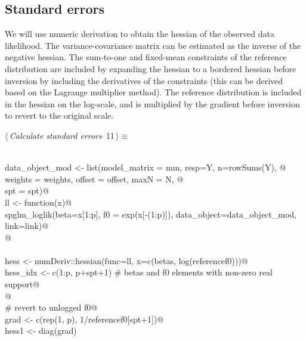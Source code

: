 \documentclass[reqno]{amsart}
\renewcommand{\NWtarget}[2]{\hypertarget{#1}{#2}}
\begin{document}
\subsection{Standard errors}

We will use numeric derivation to obtain the hessian of the observed data likelihood. The variance-covariance matrix can be estimated as the inverse of the negative hessian. The sum-to-one and fixed-mean constraints of the reference distribution are included by expanding the hessian to a bordered hessian before inversion by including the derivatives of the constraints (this can be derived based on the Lagrange multiplier method). The reference distribution is included in the hessian on the log-scale, and is multiplied by the gradient before inversion to revert to the original scale.

\begin{flushleft} \small\label{scrap13}\raggedright\small
\NWtarget{nuweb11}{} $\langle\,${\itshape Calculate standard errors}\nobreak\ {\footnotesize {11}}$\,\rangle\equiv$
\vspace{-1ex}
\begin{list}{}{} \item
\mbox{}\verb@@\\
\mbox{}\verb@  data_object_mod <- list(model_matrix = mm, resp=Y, n=rowSums(Y), @\\
\mbox{}\verb@                          weights = weights, offset = offset, maxN = N, @\\
\mbox{}\verb@                          spt = spt)@\\
\mbox{}\verb@  ll <- function(x){@\\
\mbox{}\verb@    spglm_loglik(beta=x[1:p], f0 = exp(x[-(1:p)]), data_object=data_object_mod, link=link)@\\
\mbox{}\verb@  }@\\
\mbox{}\verb@@\\
\mbox{}\verb@  hess <- numDeriv::hessian(func=ll,  x=c(betas, log(referencef0)))@\\
\mbox{}\verb@  hess_idx <- c(1:p, p+spt+1) # betas and f0 elements with non-zero real support@\\
\mbox{}\verb@  @\\
\mbox{}\verb@  # revert to unlogged f0@\\
\mbox{}\verb@  grad <- c(rep(1, p), 1/referencef0[spt+1])@\\
\mbox{}\verb@  hess1 <- diag(grad) %*% hess[hess_idx, hess_idx] %*% diag(grad)@\\

\end{list}
\end{flushleft}
\end{document}
